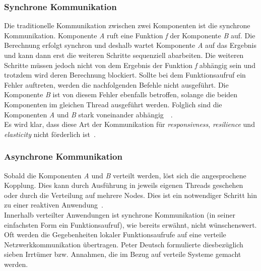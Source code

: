\subsubsection{Synchrone Kommunikation}
Die traditionelle Kommunikation zwischen zwei Komponenten ist die synchrone Kommunikation. Komponente \textit{A} ruft eine Funktion \textit{f} der Komponente \textit{B} auf. Die Berechnung erfolgt synchron und deshalb wartet Komponente \textit{A} auf das Ergebnis und kann dann erst die weiteren Schritte sequenziell abarbeiten. Die weiteren Schritte müssen jedoch nicht von dem Ergebnis der Funktion \textit{f} abhängig sein und trotzdem wird deren Berechnung blockiert. Sollte bei dem Funktionsaufruf ein Fehler auftreten, werden die nachfolgenden Befehle nicht ausgeführt. Die Komponente \textit{B} ist von diesem Fehler ebenfalls betroffen, solange die beiden Komponenten im gleichen Thread ausgeführt werden. Folglich sind die Komponenten \textit{A} und \textit{B} stark voneinander abhängig~\cite[S.~22]{kuhn_reactive_2015}~\cite{jackson_how_2016}.\\
Es wird klar, dass diese Art der Kommunikation für \textit{responsivness}, \textit{resilience} und \textit{elasticity} nicht förderlich ist~\cite[S.~46]{kuhn_reactive_2015}.

\subsubsection{Asynchrone Kommunikation}
Sobald die Komponenten \textit{A} und \textit{B} verteilt werden, löst sich die angesprochene Kopplung. Dies kann durch Ausführung in jeweils eigenen Threads geschehen oder durch die Verteilung auf mehrere Nodes. Dies ist ein notwendiger Schritt hin zu einer reaktiven Anwendung~\cite[S.~22]{kuhn_reactive_2015}.\\
Innerhalb verteilter Anwendungen ist synchrone Kommunikation (in seiner einfachsten Form ein Funktionsaufruf), wie bereits erwähnt, nicht wünschenswert. Oft werden die Gegebenheiten lokaler Funktionsaufrufe auf eine verteile Netzwerkkommunikation übertragen. Peter Deutsch formulierte diesbezüglich sieben Irrtümer bzw. Annahmen, die im Bezug auf verteile Systeme gemacht werden.\\

